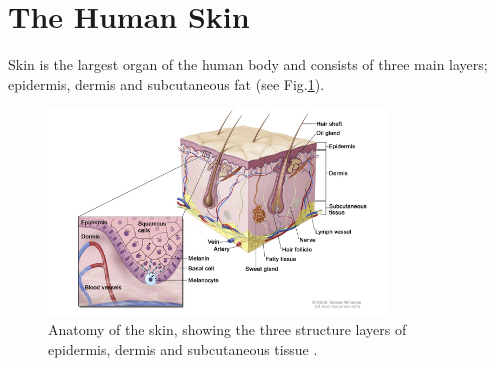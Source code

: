 \section{The Human Skin}\label{sec:chp1sec1}
Skin is the largest organ of the human body and consists of three main layers; epidermis, dermis and subcutaneous fat  \cite{anderson1981optics} (see Fig.\ref{fig:SkinAnatomy}).\\
		\begin{figure}
		\centering
		\includegraphics[width = 0.8\textwidth]{Chapter1/Figuers/SkinAnatomy.png}	
	\caption[Skin Anatomy]{Anatomy of the skin, showing the three structure layers of epidermis, dermis and subcutaneous tissue \cite{korotkov2012computerized}.}
		\label{fig:SkinAnatomy}
		\end{figure}	 
